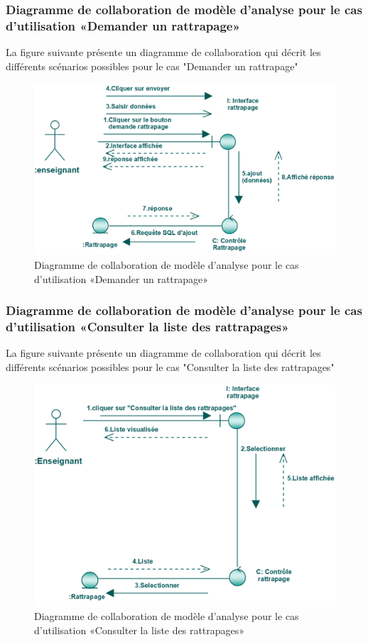 \documentclass[12 pt]{report}
\begin{document}
\subsubsection{Diagramme  de  collaboration  de  modèle  d'analyse  pour  le  cas  d'utilisation «Demander un rattrapage»  }
La figure suivante présente un diagramme de collaboration qui décrit les différents
scénarios possibles pour le cas "Demander un rattrapage"
\begin{figure}[h]
\begin{center}
\includegraphics[width= 14 cm , height =5 cm]{colla_ens_demande_rattrapage.PNG}
 \caption{Diagramme  de  collaboration  de  modèle  d'analyse  pour  le  cas  d'utilisation «Demander un rattrapage»}
\end{center}
\end{figure} 
\subsubsection{Diagramme  de  collaboration  de  modèle  d'analyse  pour  le  cas  d'utilisation «Consulter la liste des rattrapages»  }
La figure suivante présente un diagramme de collaboration qui décrit les différents
scénarios possibles pour le cas "Consulter la liste des rattrapages"
\begin{figure}[h]
\begin{center}
\includegraphics[width= 12 cm , height =4.5 cm]{cce.PNG}
 \caption{Diagramme  de  collaboration  de  modèle  d'analyse  pour  le  cas  d'utilisation «Consulter la liste des rattrapages»}
\end{center}
\end{figure}
\end{document}
